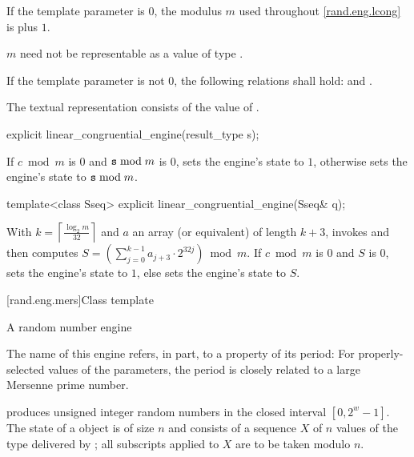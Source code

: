\pnum
If the template parameter
 is $0$,
the modulus $m$
used throughout \ref{rand.eng.lcong}
is  plus $1$.
\begin{note}
 $m$ need not be representable
 as a value of type .
\end{note}

\pnum
If the template parameter
 is not $0$,
the following relations shall hold:
and
  .

\pnum
The textual representation
consists of
the value of .

%
\begin{itemdecl}
explicit linear_congruential_engine(result_type s);
\end{itemdecl}

\begin{itemdescr}
\pnum
\effects
 If $c \bmod m$ is $0$ and $\tcode{s} \bmod m$ is $0$,
 sets the engine's state to $1$,
 otherwise sets the engine's state to $\tcode{s} \bmod m$.
\end{itemdescr}

%
\begin{itemdecl}
template<class Sseq> explicit linear_congruential_engine(Sseq& q);
\end{itemdecl}

\begin{itemdescr}
\pnum
\effects
 With
 $k = \left\lceil \frac{\log_2 m}{32} \right\rceil$
 and $a$ an array (or equivalent)
 of length $k + 3$,
 invokes 
 and then computes
 $S = \left(\sum_{j = 0}^{k - 1} a_{j + 3} \cdot 2^{32j} \right) \bmod m$.
 If $c \bmod m$ is $0$ and $S$ is $0$,
 sets the engine's state to $1$,
 else sets the engine's state
 to $S$.
\end{itemdescr}


[rand.eng.mers]{Class template }%
%

\pnum
A  random number
engine
\begin{footnote}
The name of this engine refers, in part, to a property of its period:
 For properly-selected values of the parameters,
 the period is closely related to a large Mersenne prime number.
\end{footnote}
produces unsigned integer random numbers
in the closed interval $[0,2^w-1]$.
The
state
of a  object 
is of size $n$
and consists of a sequence $X$
of $n$ values of the type delivered by ;
all subscripts applied to $X$ are to be taken modulo $n$.

